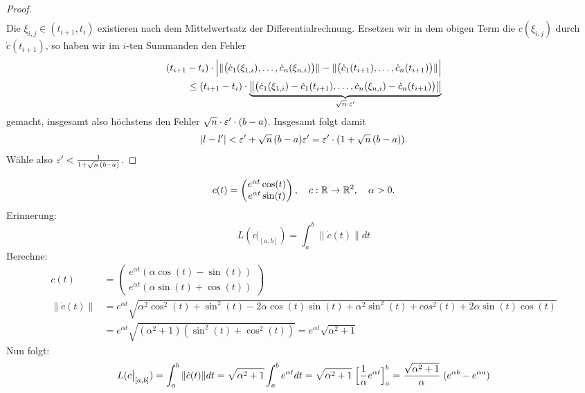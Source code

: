 \documentclass[11pt]{scrbook}
\begin{document}
\begin{st}
\begin{proof}
\begin{align*}
\end{align*}
Die $\xi_{i,j} \in (t_{i+1},t_i)$ existieren nach dem Mittelwertsatz der Differentialrechnung. 
Ersetzen wir in dem obigen Term die $\dot c(\xi_{i,j})$ durch $\dot c(t_{i+1})$, so haben wir im $i$-ten Summanden den Fehler
\begin{align*}
 (t_{i+1} - t_i) \cdot \Big | \| \big( \dot c_1(\xi_{1,i}),  \dots  , \dot c_n(\xi_{n,i}) \big)\| - \| \big( \dot c_1(t_{i+1}),  \dots  , \dot c_n(t_{i+1}) \big)\| \Big| \\
\le (t_{i+1} - t_i) \cdot \underbrace{\big \| \big(   \dot c_1(\xi_{1,i}) - \dot c_1(t_{i+1}),  \dots  , \dot c_n(\xi_{n,i}) - \dot c_n(t_{i+1}) \big) \big \| }_{\sqrt{n} \cdot \varepsilon'}
\end{align*}
gemacht, insgesamt also höchstens den Fehler $\sqrt{n} \cdot \varepsilon' \cdot (b-a)$. Insgesamt folgt damit
\[ |l-l'| < \varepsilon' + \sqrt{n} \, (b-a) \varepsilon' = \varepsilon' \cdot (1 + \sqrt{n} \,  (b-a)). \]
Wähle also  $\varepsilon' < \frac{1}{1+\sqrt{n} \, (b-a)}$.
\end{proof}
\end{st}

\begin{ex}
\[ c(t) = \begin{pmatrix} e^{\alpha t} \cos(t) \\ e^{\alpha t} \sin(t) \end{pmatrix} , \quad c: \mathbb{R} \to \mathbb{R}^2, \quad \alpha > 0. \]
Erinnerung: \[ L(c \big |_{[a,b]}) = \int_a^b \| \dot c(t) \| dt  \]
Berechne: 
\begin{align*}
 \dot c (t) &= \begin{pmatrix} e^{\alpha t} (\alpha \cos(t) - \sin(t)) \\ e^{\alpha t} (\alpha \sin(t) + \cos(t)) \end{pmatrix}  \\
  \| \dot c(t) \| &= e^{\alpha t} \sqrt{\alpha^2 \cos^2(t) + \sin^2(t) - 2 \alpha \cos(t) \sin(t) + \alpha^2 \sin^2(t) + cos^2(t) + 2 \alpha \sin(t) \cos(t)} \\
 &= e^{\alpha t} \sqrt{(\alpha^2 +  1) (\sin^2(t) + \cos^2(t) )} = e^{\alpha t} \sqrt{\alpha^2 + 1} 
\end{align*}
Nun folgt: 
\[
 L(c \big |_{[a,b]}) =  \int_a^b \| \dot c(t) \| dt  = \sqrt{\alpha^2 + 1}  \int_a^b  e^{\alpha t} dt  
 = \sqrt{\alpha^2 + 1} \; \Big [ \frac{1}{\alpha} e^{\alpha t} \Big ]_a^b  = \frac{\sqrt{\alpha^2 + 1}}{\alpha} \; (e^{\alpha b} - e^{\alpha a} ) 
\]

\end{ex}
\end{document}
